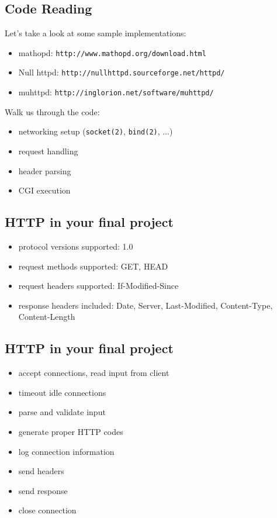 \documentclass[xga]{xdvislides}
\begin{document}
\subsection{Code Reading}
Let's take a look at some sample implementations:

\begin{itemize}
	\item mathopd: \verb+http://www.mathopd.org/download.html+
	\item Null httpd: \verb+http://nullhttpd.sourceforge.net/httpd/+
	\item muhttpd: \verb+http://inglorion.net/software/muhttpd/+
\end{itemize}
\vspace{.5in}
Walk us through the code:
\begin{itemize}
	\item networking setup ({\tt socket(2)}, {\tt bind(2)}, ...)
	\item request handling
	\item header parsing
	\item CGI execution
\end{itemize}

\subsection{HTTP in your final project}
\begin{itemize}
	\item protocol versions supported: 1.0
	\item request methods supported: GET, HEAD
	\item request headers supported: If-Modified-Since
	\item response headers included: Date, Server, Last-Modified, Content-Type, Content-Length
\end{itemize}

\subsection{HTTP in your final project}
\begin{itemize}
	\item accept connections, read input from client
	\item timeout idle connections
	\item parse and validate input
	\item generate proper HTTP codes
	\item log connection information
	\item send headers
	\item send response
	\item close connection
\end{itemize}
\end{document}
